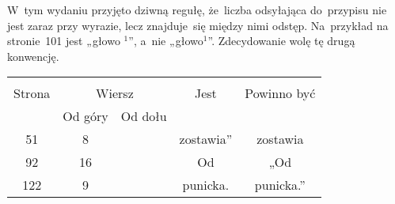 \documentclass[a4paper,11pt]{article}
\begin{document}
\vspace{\spaceTwo}










\newpage
{}



\start W~tym wydaniu przyjęto dziwną regułę, że~liczba odsyłająca
do~przypisu nie jest zaraz przy wyrazie,
lecz znajduje~się między nimi odstęp. Na~przykład na stronie~101 jest
„głowo $^{ 1 }$”, a~nie „głowo$^{ 1 }$”. Zdecydowanie wolę tę drugą
konwencję.

\vspace{\spaceTwo}










\newpage
{}





\begin{center}

  \begin{tabular}{|c|c|c|c|c|}
    \hline
    & \multicolumn{2}{c|}{} & & \\
    Strona & \multicolumn{2}{c|}{Wiersz} & Jest
                              & Powinno być \\ \cline{2-3}
    & Od góry & Od dołu & & \\
    \hline
    51  &  8 & & zostawia” & zostawia \\
    92  & 16 & & Od & „Od \\
    122 &  9 & & punicka. & punicka.” \\
    \hline
  \end{tabular}

\end{center}
\end{document}
